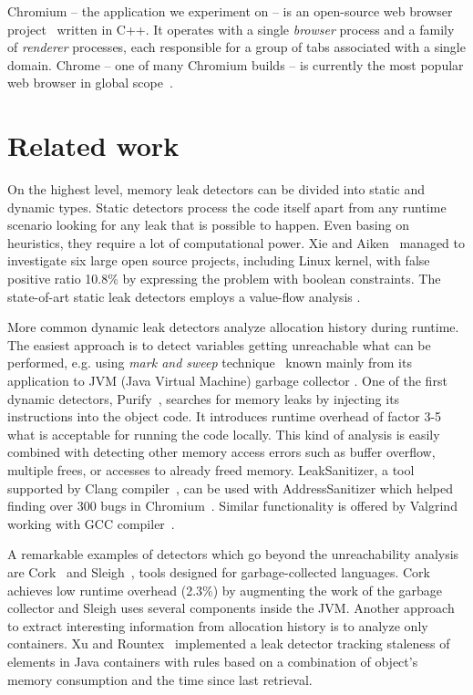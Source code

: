 \documentclass[preprint, numbers]{sigplanconf}
\newcommand{\todo}[1]{{\color{red}{(TODO: #1)}}}
\begin{document}
Chromium -- the application we experiment on -- is an open-source web browser project~\cite{chromium} written in C++.
It operates with a single \textit{browser} process and a family
of \textit{renderer} processes, each responsible for a group
of tabs associated with a single domain.
Chrome -- one of many Chromium builds -- is currently the most popular web browser in global scope~\cite{wikimedia}.


\section{Related work}

On the highest level, memory leak detectors can be divided into static
and dynamic types.
Static detectors process the code itself apart from any runtime scenario
looking for any leak that is possible to happen.
Even basing on heuristics, they require a lot of computational power.
Xie and Aiken~\cite{boolean} managed to investigate six large open source
projects, including Linux kernel, with false positive ratio 10.8\%
by expressing the problem with boolean constraints.
The state-of-art static leak detectors employs a value-flow
analysis \cite{flow, saber}.

More common dynamic leak detectors analyze allocation history during runtime.
The easiest approach is to detect variables getting unreachable
what can be performed, e.g. using \textit{mark and sweep} technique~\cite{mark-and-sweep}
known mainly from its application to JVM (Java Virtual Machine) garbage collector \todo{cite}.
One of the first dynamic detectors, Purify~\cite{purify}, searches for memory leaks by injecting its instructions
into the object code.
It introduces runtime overhead of factor 3-5 what is acceptable for running
the code locally.
This kind of analysis is easily combined with detecting other memory access errors
such as buffer overflow, multiple frees, or accesses to already freed memory.
LeakSanitizer, a tool supported by Clang compiler~\cite{leak-san}, can be used with AddressSanitizer
which helped finding over 300 bugs in Chromium~\cite{address}.
Similar functionality is offered by Valgrind working with GCC compiler~\cite{valgrind}.

A remarkable examples of detectors which go beyond the unreachability analysis
are Cork~\cite{cork} and Sleigh~\cite{sleigh}, tools designed for garbage-collected languages.
Cork achieves low runtime overhead (2.3\%) by augmenting the work of the garbage collector
and Sleigh uses several components inside the JVM.
Another approach to extract interesting information from allocation history
is to analyze only containers.
Xu and Rountex~\cite{containers} implemented a leak detector tracking staleness
of elements in Java containers with rules based on a combination of
object's memory consumption and the time since last retrieval.
\end{document}
